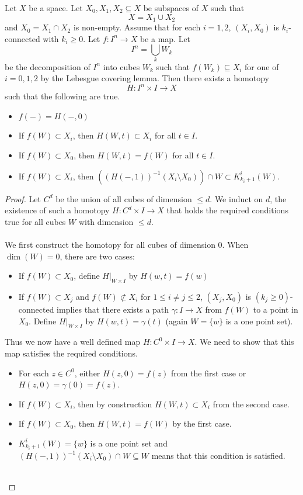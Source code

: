 \documentclass[a4paper]{article}
\begin{document}
\begin{lmm}{}{} Let $X$ be a space. Let $X_0,X_1,X_2\subseteq X$ be subspaces of $X$ such that $$X=X_1\cup X_2$$ and $X_0=X_1\cap X_2$ is non-empty. Assume that for each $i=1,2$, $(X_i,X_0)$ is $k_i$-connected with $k_i\geq 0$. Let $f:I^n\to X$ be a map. Let $$I^n=\bigcup_k W_k$$ be the decomposition of $I^n$ into cubes $W_k$ such that $f(W_k)\subseteq X_i$ for one of $i=0,1,2$ by the Lebesgue covering lemma. Then there exists a homotopy $$H:I^n\times I\to X$$ such that the following are true. 
\begin{itemize}
\item $f(-)=H(-,0)$
\item If $f(W)\subset X_i$, then $H(W,t)\subset X_i$ for all $t\in I$. 
\item If $f(W)\subset X_0$, then $H(W,t)=f(W)$ for all $t\in I$. 
\item If $f(W)\subset X_i$, then $\left((H(-,1))^{-1}(X_i\setminus X_0)\right)\cap W\subset K_{k_i+1}^i(W)$. 
\end{itemize} 
\begin{proof}
Let $C^d$ be the union of all cubes of dimension $\leq d$. We induct on $d$, the existence of such a homotopy $H:C^d\times I\to X$ that holds the required conditions true for all cubes $W$ with dimension $\leq d$. \\~\\

We first construct the homotopy for all cubes of dimension $0$. When $\dim(W)=0$, there are two cases: 
\begin{itemize}
\item If $f(W)\subset X_0$, define $H|_{W\times I}$ by $H(w,t)=f(w)$
\item If $f(W)\subset X_j$ and $f(W)\not\subset X_i$ for $1\leq i\neq j\leq 2$, $(X_j,X_0)$ is $(k_j\geq 0)$-connected implies that there exists a path $\gamma:I\to X$ from $f(W)$ to a point in $X_0$. Define $H|_{W\times I}$ by $H(w,t)=\gamma(t)$ (again $W=\{w\}$ is a one point set). 
\end{itemize}
Thus we now have a well defined map $H:C^0\times I\to X$. We need to show that this map satisfies the required conditions. 
\begin{itemize}
\item For each $z\in C^0$, either $H(z,0)=f(z)$ from the first case or $H(z,0)=\gamma(0)=f(z)$. 
\item If $f(W)\subset X_i$, then by construction $H(W,t)\subset X_i$ from the second case. 
\item If $f(W)\subset X_0$, then $H(W,t)=f(W)$ by the first case. 
\item $K_{k_i+1}^i(W)=\{w\}$ is a one point set and $(H(-,1))^{-1}(X_i\setminus X_0)\cap W\subseteq W$ means that this condition is satisfied. 
\end{itemize}~\\


\end{proof}
\end{lmm}
\end{document}
